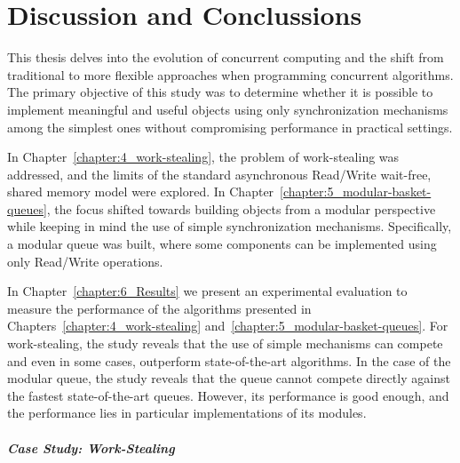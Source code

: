 \chapter{Discussion and Conclussions}

This thesis delves into the evolution of concurrent computing and the shift from traditional to more flexible approaches when programming concurrent algorithms. The primary objective of this study was to determine whether it is possible to implement meaningful and useful objects using only synchronization mechanisms among the simplest ones without compromising performance in practical settings.

In Chapter~\ref{chapter:4_work-stealing}, the problem of work-stealing was addressed, and the limits of the standard asynchronous Read/Write wait-free, shared memory model were explored. In Chapter~\ref{chapter:5_modular-basket-queues}, the focus shifted towards building objects from a modular perspective while keeping in mind the use of simple synchronization mechanisms. Specifically, a modular queue was built, where some components can be implemented using only Read/Write operations.


In Chapter~\ref{chapter:6_Results} we present an experimental evaluation to measure the performance of the algorithms presented in Chapters~\ref{chapter:4_work-stealing} and~\ref{chapter:5_modular-basket-queues}. For work-stealing, the study reveals that the use of simple mechanisms can compete and even in some cases, outperform state-of-the-art algorithms. In the case of the modular queue, the study reveals that the queue cannot compete directly against the fastest state-of-the-art queues. However, its performance is good enough, and the performance lies in particular implementations of its modules.


\paragraph{\label{sec:experiment-conclussions} Case Study: Work-Stealing}

